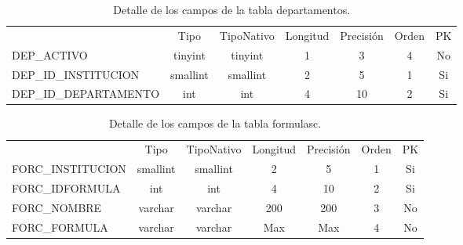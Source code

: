 		    	\begin{table}[H]
				\centering
				\caption{Detalle de los campos de la tabla departamentos.}
				\label{tab_departamentos}
					\begin{tabular}{|l|c|c|c|c|c|c|}
						\hline
						\rowcolor[HTML]{329A9D} 
						\multicolumn{7}{|c|}{\cellcolor[HTML]{329A9D}DEPARTAMENTOS}                                                      \\ \hline
						\rowcolor[HTML]{00D2CB} 
						\multicolumn{1}{|c|}{\cellcolor[HTML]{00D2CB}Nombre} & Tipo     & TipoNativo & Longitud & Precisi\'on & Orden & PK \\ \hline
						DEP\_ACTIVO                                          & tinyint  & tinyint    & 1        & 3         & 4     & No \\ \hline
						DEP\_ID\_INSTITUCION                                 & smallint & smallint   & 2        & 5         & 1     & Si \\ \hline
						DEP\_ID\_DEPARTAMENTO                                & int      & int        & 4        & 10        & 2     & Si \\ \hline
					\end{tabular}
				\end{table}


				\begin{table}[H]
					\centering
					\caption{Detalle de los campos de la tabla formulasc.}
					\label{tab_formulasc}
					\begin{tabular}{|l|c|c|c|c|c|c|}
						\hline
						\rowcolor[HTML]{329A9D} 
						\multicolumn{7}{|c|}{\cellcolor[HTML]{329A9D}FORMULASC}                                                          \\ \hline
						\rowcolor[HTML]{00D2CB} 
						\multicolumn{1}{|c|}{\cellcolor[HTML]{00D2CB}Nombre} & Tipo     & TipoNativo & Longitud & Precisi\'on & Orden & PK \\ \hline
						FORC\_INSTITUCION                                    & smallint & smallint   & 2        & 5         & 1     & Si \\ \hline
						FORC\_IDFORMULA                                      & int      & int        & 4        & 10        & 2     & Si \\ \hline
						FORC\_NOMBRE                                         & varchar  & varchar    & 200      & 200       & 3     & No \\ \hline
						FORC\_FORMULA                                        & varchar  & varchar    & Max      & Max       & 4     & No \\ \hline
					\end{tabular}
				\end{table}

